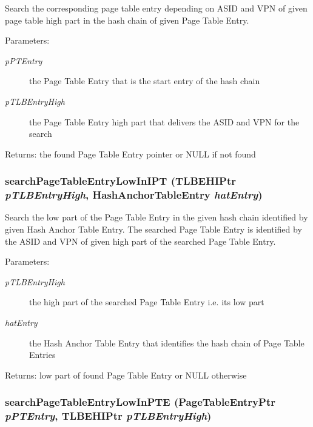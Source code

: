 Search the corresponding page table entry depending on ASID and VPN of given page table high part in the hash chain of given Page Table Entry. \begin{Desc}
\item[Parameters:]
\begin{description}
\item[{\em pPTEntry}]the Page Table Entry that is the start entry of the hash chain \item[{\em pTLBEntryHigh}]the Page Table Entry high part that delivers the ASID and VPN for the search \end{description}
\end{Desc}
\begin{Desc}
\item[Returns:]the found Page Table Entry pointer or NULL if not found \end{Desc}
\hypertarget{group___v_m_m___i_p_t_ga1a233ecd4f829d64f29c55c5c2b369b}{
\subsubsection[{searchPageTableEntryLowInIPT}]{ searchPageTableEntryLowInIPT ({\bf TLBEHIPtr} {\em pTLBEntryHigh}, \/  {\bf HashAnchorTableEntry} {\em hatEntry})}}
\label{group___v_m_m___i_p_t_ga1a233ecd4f829d64f29c55c5c2b369b}


Search the low part of the Page Table Entry in the given hash chain identified by given Hash Anchor Table Entry. The searched Page Table Entry is identified by the ASID and VPN of given high part of the searched Page Table Entry. \begin{Desc}
\item[Parameters:]
\begin{description}
\item[{\em pTLBEntryHigh}]the high part of the searched Page Table Entry i.e. its low part \item[{\em hatEntry}]the Hash Anchor Table Entry that identifies the hash chain of Page Table Entries \end{description}
\end{Desc}
\begin{Desc}
\item[Returns:]low part of found Page Table Entry or NULL otherwise \end{Desc}
\hypertarget{group___v_m_m___i_p_t_g4d5cd060a657ba3d732c739461a583a9}{
\subsubsection[{searchPageTableEntryLowInPTE}]{ searchPageTableEntryLowInPTE ({\bf PageTableEntryPtr} {\em pPTEntry}, \/  {\bf TLBEHIPtr} {\em pTLBEntryHigh})}}
\label{group___v_m_m___i_p_t_g4d5cd060a657ba3d732c739461a583a9}


